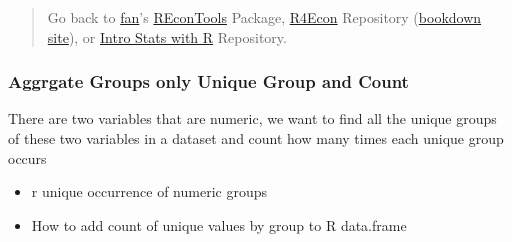 \documentclass[
]{book}
\providecommand{\tightlist}{%
  \setlength{\itemsep}{0pt}\setlength{\parskip}{0pt}}
\begin{document}
\begin{quote}
Go back to \href{http://fanwangecon.github.io/}{fan}'s \href{https://fanwangecon.github.io/REconTools/}{REconTools} Package, \href{https://fanwangecon.github.io/R4Econ/}{R4Econ} Repository (\href{https://fanwangecon.github.io/R4Econ/bookdown}{bookdown site}), or \href{https://fanwangecon.github.io/Stat4Econ/}{Intro Stats with R} Repository.
\end{quote}

\hypertarget{aggrgate-groups-only-unique-group-and-count}{%
\subsubsection{Aggrgate Groups only Unique Group and Count}\label{aggrgate-groups-only-unique-group-and-count}}

There are two variables that are numeric, we want to find all the unique groups of these two variables in a dataset and count how many times each unique group occurs

\begin{itemize}
\tightlist
\item
  r unique occurrence of numeric groups
\item
  How to add count of unique values by group to R data.frame
\end{itemize}
\end{document}
